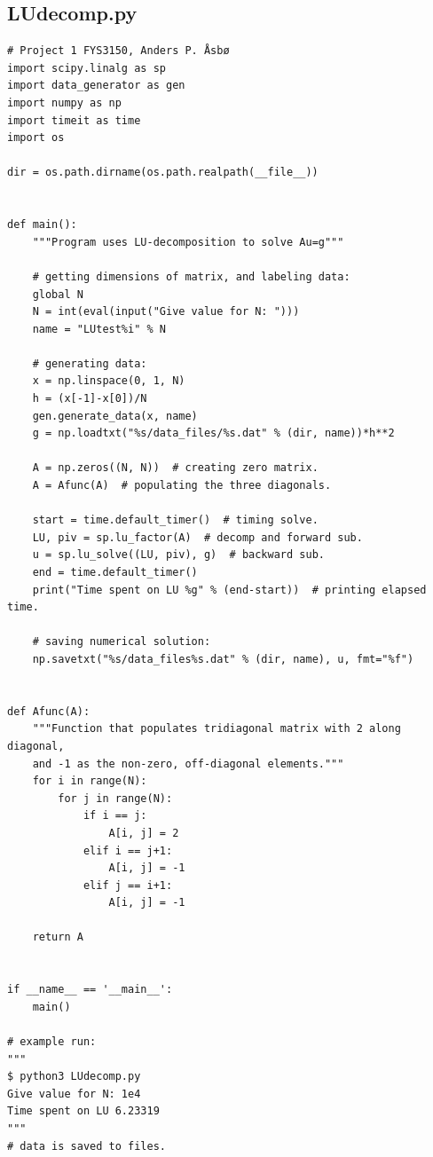 \documentclass[english,notitlepage,reprint]{revtex4-1}  %
\begin{document}
\subsection{LUdecomp.py}\label{A:5}
\begin{lstlisting}
# Project 1 FYS3150, Anders P. Åsbø
import scipy.linalg as sp
import data_generator as gen
import numpy as np
import timeit as time
import os

dir = os.path.dirname(os.path.realpath(__file__))


def main():
    """Program uses LU-decomposition to solve Au=g"""

    # getting dimensions of matrix, and labeling data:
    global N
    N = int(eval(input("Give value for N: ")))
    name = "LUtest%i" % N

    # generating data:
    x = np.linspace(0, 1, N)
    h = (x[-1]-x[0])/N
    gen.generate_data(x, name)
    g = np.loadtxt("%s/data_files/%s.dat" % (dir, name))*h**2

    A = np.zeros((N, N))  # creating zero matrix.
    A = Afunc(A)  # populating the three diagonals.

    start = time.default_timer()  # timing solve.
    LU, piv = sp.lu_factor(A)  # decomp and forward sub.
    u = sp.lu_solve((LU, piv), g)  # backward sub.
    end = time.default_timer()
    print("Time spent on LU %g" % (end-start))  # printing elapsed time.

    # saving numerical solution:
    np.savetxt("%s/data_files%s.dat" % (dir, name), u, fmt="%f")


def Afunc(A):
    """Function that populates tridiagonal matrix with 2 along diagonal,
    and -1 as the non-zero, off-diagonal elements."""
    for i in range(N):
        for j in range(N):
            if i == j:
                A[i, j] = 2
            elif i == j+1:
                A[i, j] = -1
            elif j == i+1:
                A[i, j] = -1

    return A


if __name__ == '__main__':
    main()

# example run:
"""
$ python3 LUdecomp.py
Give value for N: 1e4
Time spent on LU 6.23319
"""
# data is saved to files.

\end{lstlisting}

{}
\end{document}
